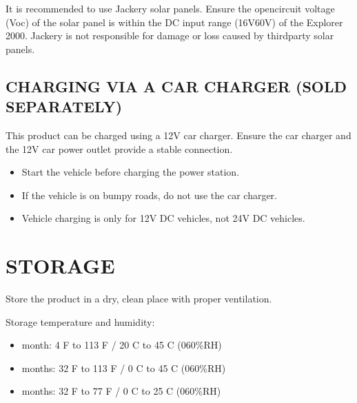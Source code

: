 \documentclass[a4paper,10pt,twoside,openany,english]{sphinxhowto}
\let\sphinxpxdimen\pdfpxdimen\else\newdimen\sphinxpxdimen
\begin{document}
\sphinxAtStartPar
It is recommended to use Jackery solar panels. Ensure the open\sphinxhyphen{}circuit voltage (Voc)
of the solar panel is within the DC input range (16V\sphinxhyphen{}60V) of the Explorer 2000.
Jackery is not responsible for damage or loss caused by third\sphinxhyphen{}party solar panels.


\subsection{CHARGING VIA A CAR CHARGER (SOLD SEPARATELY)}
\label{\detokenize{index:charging-via-a-car-charger-sold-separately}}
\sphinxAtStartPar
This product can be charged using a 12V car charger.
Ensure the car charger and the 12V car power outlet provide a stable connection.

\noindent\sphinxincludegraphics[width=360\sphinxpxdimen]{{fig}.png}

\sphinxAtStartPar
{}

\sphinxAtStartPar
{}
\begin{itemize}
\item {} 
\sphinxAtStartPar
Start the vehicle before charging the power station.

\item {} 
\sphinxAtStartPar
If the vehicle is on bumpy roads, do not use the car charger.

\item {} 
\sphinxAtStartPar
Vehicle charging is only for 12V DC vehicles, not 24V DC vehicles.

\end{itemize}



\section{STORAGE}
\label{\detokenize{index:storage}}
\sphinxAtStartPar
Store the product in a dry, clean place with proper ventilation.

\sphinxAtStartPar
Storage temperature and humidity:
\begin{itemize}
\item {} 
 month: \sphinxhyphen{}4 F to 113 F / \sphinxhyphen{}20 C to 45 C (0\sphinxhyphen{}60\%RH)

\item {} 
 months: 32 F to 113 F / 0 C to 45 C (0\sphinxhyphen{}60\%RH)

\item {} 
 months: 32 F to 77 F / 0 C to 25 C (0\sphinxhyphen{}60\%RH)

\end{itemize}
\end{document}
